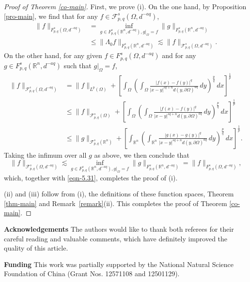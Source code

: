 \documentclass[11pt,twoside]{article}
\def\rn{{\mathbb{R}^n}}
\def\cf{{\mathcal F}}
\def\boz{{\Omega}}
\def\pa{\partial}                %
\def\huafwe{{\cf}_{p,q}^s(\boz,d^{-aq})}
\theoremstyle{mylem}
\theoremstyle{definition}
\numberwithin{equation}{section}
\begin{document}
\begin{proof}[Proof of Theorem \ref{co-main}]
First, we prove (i). On the one hand, by Proposition \ref{pro-main}, we find that for any $f\in \huafwe$,
\begin{align}\label{eqn-5.31}
\|f\|_{F_{p, q}^{s}(\boz,d^{-aq})}
&=\inf_{{g\in F_{p,q}^s(\rn,d^{-aq})} , g|_{\boz}=f} \|g\|_{F_{p,q}^s(\rn,d^{-aq})}\nonumber\\
&\leq \|\Lambda_0 f\|_{{F_{p,q}^s(\rn,d^{-aq})}} \lesssim \|f\|_{\huafwe}.
\end{align}
On the other hand, for any given $f\in F_{p,q}^s(\boz,d^{-aq})$ and for any $g\in F_{p,q}^s(\rn,d^{-aq})$ such that $g|_{\boz}=f$,
\begin{align*}
\| f \|_{\cf_{p,q}^{s}(\boz,d^{-aq})}
&=\| f \|_{L^p(\boz)} + \left[ \int_{\boz} \left( \int_{\boz} \frac{|f(x) - f(y)|^q}{|x - y|^{s q + n}d(y,\pa\boz)^{aq}}\,dy \right)^{\frac{p}{q}}\,dx \right]^{\frac{1}{p}} \\ 
&\leq \| f \|_{\cf_{p,q}^{s}(\boz)} + \left[ \int_{\boz} \left( \int_{\boz} \frac{|f(x) - f(y)|^q}{|x - y|^{s q + n}d(y,\pa\boz)^{aq}} \,dy \right)^{\frac{p}{q}}\,dx \right]^{\frac{1}{p}} \\ 
&\leq \| g \|_{\cf_{p,q}^{s}(\rn)} + \left[ \int_{\rn} \left( \int_{\rn} \frac{|g(x) - g(y)|^q}{|x - y|^{s q + n}d(y,\pa\boz)^{aq}} \,dy \right)^{\frac{p}{q}}\,dx \right]^{\frac{1}{p}}.
\end{align*}
Taking the infimum over all $g$ as above, we then conclude that 
\[
\| f \|_{\cf_{p,q}^{s}(\boz,d^{-aq})} \lesssim \inf_{{g\in F_{p,q}^s(\rn,d^{-aq})} , g|_{\boz}=f} \|g\|_{F_{p,q}^s(\rn,d^{-aq})} = \|f\|_{F_{p, q}^{s}(\boz,d^{-aq})},
\]
which, together with \eqref{eqn-5.31}, completes the proof of (i).

(ii) and (iii) follow from (i), the definitions
of these function spaces, Theorem \ref{thm-main}
and Remark~\ref{remark}(ii).
This completes the proof of Theorem \ref{co-main}.
\end{proof}

\noindent\textbf{Acknowledgements}\quad
The authors would like to thank both referees for their careful reading
and valuable comments,
which have definitely improved the quality of this article.

\medskip

\noindent\textbf{Funding}\quad
This work was partially supported by
the National Natural Science Foundation of China
(Grant Nos. 12571108 and 12501129).

\medskip
\end{document}
